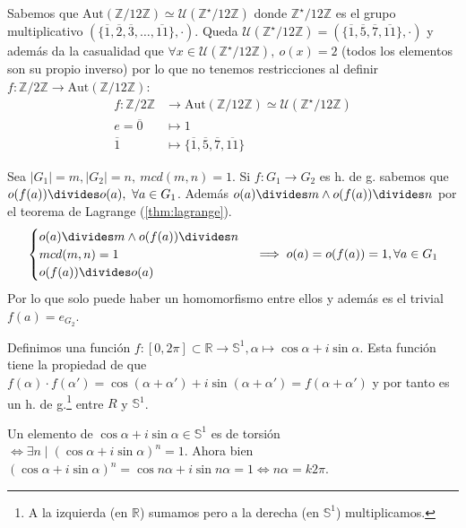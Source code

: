 \documentclass{book}
\theoremstyle{definition}
\theoremstyle{remark}
\newcommand{\uds}[1]{\mathcal{U}(#1)}
\newcommand{\isom}{\simeq}
\newcommand{\autom}[1]{\text{Aut}(#1)}
\newcommand{\Z}{\mathbb{Z}}
\newcommand{\R}{\mathbb{R}}
\begin{document}
\begin{ex}[H2.25]
	Sabemos que $\autom{\Z/12\Z} \isom \uds{\Z^\star/12\Z}$ donde $\Z^\star/12\Z$ es el grupo multiplicativo $(\{\overline{1}, \overline{2}, \overline{3}, \dots,  \overline{11}\}, \cdot)$. Queda $\uds{\Z^\star/12\Z} = (\{\overline{1}, \overline{5}, \overline{7}, \overline{11}\}, \cdot )$ y además da la casualidad que $\forall x \in \uds{\Z^\star/12\Z},\ o(x) = 2$ (todos los elementos son su propio inverso) por lo que no tenemos restricciones al definir $f: \Z/2\Z \to \autom{\Z/12\Z}$:
	\begin{align*}
		f:\Z/2\Z & \to \autom{\Z/12\Z} \isom \uds{\Z^\star/12\Z} \\
		e = \overline{0} &\mapsto 1 \\
		\overline{1} &\mapsto \{\overline{1}, \overline{5}, \overline{7}, \overline{11}\}
	\end{align*}
\end{ex}

\begin{ex}[H2.26]
	Sea $|G_1| = m, |G_2| = n,\ mcd(m, n) = 1$. Si $f:G_1 \to G_2$ es h. de g. sabemos que $o(f(a)) \divides o(a),\ \forall a \in G_1$. Además $o(a) \divides m \land o(f(a)) \divides n$ por el teorema de Lagrange (\ref{thm:lagrange}).
	\begin{align*}
		\begin{cases}
		o(a) \divides m \land o(f(a)) \divides n \\
		mcd(m, n) = 1 \\
		o(f(a)) \divides o(a)
		\end{cases} \implies o(a) = o(f(a)) = 1, \forall a \in G_1
	\end{align*}
	Por lo que solo puede haber un homomorfismo entre ellos y además es el trivial $f(a) = e_{G_2}$.
\end{ex}

\begin{ex}[H2.19]
	Definimos una función $f:[0, 2\pi] \subset \R \to \mathbb{S}^1, \alpha\mapsto \cos \alpha + i \sin \alpha$. Esta función tiene la propiedad de que $f(\alpha) \cdot f(\alpha') = \cos(\alpha + \alpha') + i\sin(\alpha + \alpha') = f(\alpha + \alpha')$ y por tanto es un h. de g.\footnote{A la izquierda (en $\R$) sumamos pero a la derecha (en $\mathbb{S}^1$) multiplicamos.} entre $R$ y $\mathbb{S}^1$.
	
	Un elemento de $\cos \alpha + i \sin \alpha \in \mathbb{S}^1$ es de torsión $\iff \exists n \mid (\cos \alpha + i \sin \alpha )^n = 1$. Ahora bien $(\cos \alpha + i \sin \alpha )^n = \cos n\alpha + i \sin n\alpha = 1 \iff n\alpha = k 2\pi$. 
\end{ex}
\end{document}
